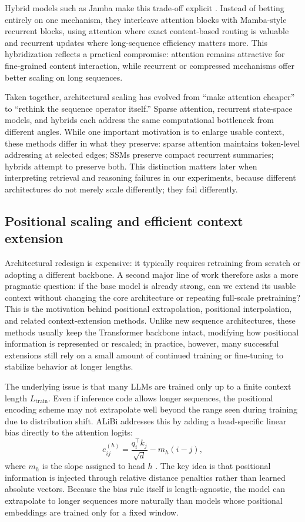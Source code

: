 \documentclass{article}
\begin{document}
Hybrid models such as Jamba make this trade-off explicit \citep{lieber2024jamba}. Instead of betting entirely on one mechanism, they interleave attention blocks with Mamba-style recurrent blocks, using attention where exact content-based routing is valuable and recurrent updates where long-sequence efficiency matters more. This hybridization reflects a practical compromise: attention remains attractive for fine-grained content interaction, while recurrent or compressed mechanisms offer better scaling on long sequences.

Taken together, architectural scaling has evolved from ``make attention cheaper'' to ``rethink the sequence operator itself.'' Sparse attention, recurrent state-space models, and hybrids each address the same computational bottleneck from different angles. While one important motivation is to enlarge usable context, these methods differ in what they preserve: sparse attention maintains token-level addressing at selected edges; SSMs preserve compact recurrent summaries; hybrids attempt to preserve both. This distinction matters later when interpreting retrieval and reasoning failures in our experiments, because different architectures do not merely scale differently; they fail differently.

\subsection{Positional scaling and efficient context extension}
Architectural redesign is expensive: it typically requires retraining from scratch or adopting a different backbone. A second major line of work therefore asks a more pragmatic question: if the base model is already strong, can we extend its usable context without changing the core architecture or repeating full-scale pretraining? This is the motivation behind positional extrapolation, positional interpolation, and related context-extension methods. Unlike new sequence architectures, these methods usually keep the Transformer backbone intact, modifying how positional information is represented or rescaled; in practice, however, many successful extensions still rely on a small amount of continued training or fine-tuning to stabilize behavior at longer lengths.

The underlying issue is that many LLMs are trained only up to a finite context length $L_{\mathrm{train}}$. Even if inference code allows longer sequences, the positional encoding scheme may not extrapolate well beyond the range seen during training due to distribution shift. ALiBi addresses this by adding a head-specific linear bias directly to the attention logits:
\begin{equation}
e_{ij}^{(h)}=\frac{q_i^\top k_j}{\sqrt{d}} - m_h(i-j),
\end{equation}
where $m_h$ is the slope assigned to head $h$ \citep{press2022alibi}. The key idea is that positional information is injected through relative distance penalties rather than learned absolute vectors. Because the bias rule itself is length-agnostic, the model can extrapolate to longer sequences more naturally than models whose positional embeddings are trained only for a fixed window.
\end{document}

